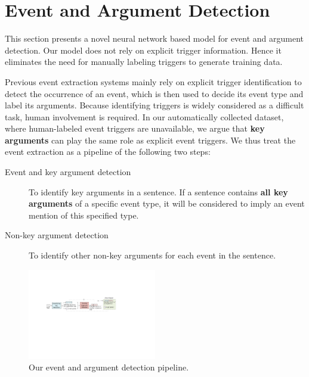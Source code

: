 \section{Event and Argument Detection}
This section presents a novel neural network based model for event and argument detection. Our model does not rely on explicit trigger
information. Hence it eliminates the need for manually labeling triggers to generate training data.

Previous event extraction systems mainly rely on explicit trigger identification to detect the occurrence of an event, which is then used
to decide its event type and label its arguments. Because identifying triggers is widely considered as a difficult task, human involvement
is required\FIXME{~\cite{}}. In our automatically collected dataset, where human-labeled event triggers are unavailable, we argue that
\textbf{key arguments} can play the same role as explicit event triggers. We thus treat the event extraction as a pipeline of the following
two steps:

\begin{description}
	\item [Event and key argument detection]  To identify key arguments in a sentence. If a sentence contains \textbf{all key arguments} of a specific event type, it will be considered to imply an event mention of this specified type.
	\item [Non-key argument detection] To identify other non-key arguments for each event in the sentence.
\end{description}

\begin{figure}[t!]
  \centering
  \includegraphics[width=0.5\textwidth]{figs/model.pdf}
  \caption{Our event and argument detection pipeline.}\label{fig:model}
\end{figure}

